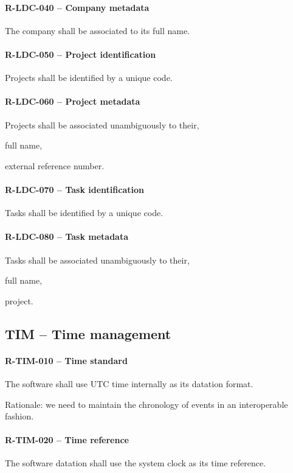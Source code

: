\paragraph{R-LDC-040 -- Company metadata}
The company shall be associated to its full name.

\paragraph{R-LDC-050 -- Project identification}
Projects shall be identified by a unique code.

\paragraph{R-LDC-060 -- Project metadata}
Projects shall be associated unambiguously to their,
\begin{compactitem}
  \item full name,
  \item external reference number.
\end{compactitem}

\paragraph{R-LDC-070 -- Task identification}
Tasks shall be identified by a unique code.

\paragraph{R-LDC-080 -- Task metadata}
Tasks shall be associated unambiguously to their,
\begin{compactitem}
  \item full name,
  \item project.
\end{compactitem}

\subsection{TIM -- Time management}
\paragraph{R-TIM-010 -- Time standard}
The software shall use UTC time internally as its datation format.

Rationale: we need to maintain the chronology of events in an interoperable
fashion.

\paragraph{R-TIM-020 -- Time reference}
The software datation shall use the system clock as its time reference.

